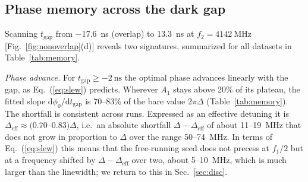 \documentclass[aps,prb,reprint,superscriptaddress,floatfix]{revtex4-2}
\newcommand{\tgap}{t_{\mathrm{gap}}}
\newcommand{\Deff}{\Delta_{\mathrm{eff}}}
\begin{document}
\subsection{Phase memory across the dark gap}\label{sec:memory}

Scanning $\tgap$ from \SI{-17.6}{\nano\second} (overlap) to \SI{+13.3}{\nano\second} at $f_2=\SI{4142}{\mega\hertz}$ [Fig.~\ref{fig:nonoverlap}(d)] reveals two signatures, summarized for all datasets in Table~\ref{tab:memory}.

\emph{Phase advance.} For $\tgap\ge\SI{-2}{\nano\second}$ the optimal phase advances linearly with the gap, as Eq.~(\ref{eq:slew}) predicts. Wherever $A_1$ stays above 20\% of its plateau, the fitted slope $\mathrm{d}\phi_0/\mathrm{d}\tgap$ is 70--83\% of the bare value $2\pi\Delta$ (Table~\ref{tab:memory}). The shortfall is consistent across runs. Expressed as an effective detuning it is $\Deff\approx(0.70$--$0.83)\Delta$, i.e.\ an absolute shortfall $\Delta-\Deff$ of about 11--\SI{19}{\mega\hertz} that does not grow in proportion to $\Delta$ over the range 50--\SI{74}{\mega\hertz}. In terms of Eq.~(\ref{eq:slew}) this means that the free-running seed does not precess at $f_1/2$ but at a frequency shifted by $\Delta-\Deff$ over two, about 5--\SI{10}{\mega\hertz}, which is much larger than the linewidth; we return to this in Sec.~\ref{sec:disc}.
\end{document}
